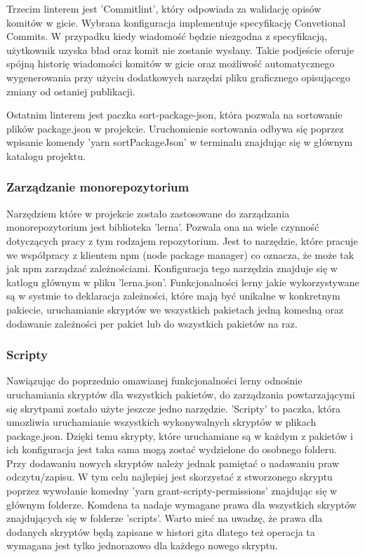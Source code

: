 Trzecim linterem jest 'Commitlint', który odpowiada za walidację opisów komitów w gicie. Wybrana konfiguracja implementuje specyfikację Convetional Commits. W przypadku kiedy wiadomość będzie niezgodna z specyfikacją, użytkownik uzyska bład oraz komit nie zostanie wysłany. Takie podjeście oferuje spójną historię wiadomości komitów w gicie oraz możliwość automatycznego wygenerowania przy użyciu dodatkowych narzędzi pliku graficznego opisującego zmiany od ostaniej publikacji.

Ostatnim linterem jest paczka sort-package-json, która pozwala na sortowanie plików package.json w projekcie. Uruchomienie sortowania odbywa się poprzez wpisanie komendy 'yarn sortPackageJson' w terminalu znajdując się w głównym katalogu projektu. 

\subsubsection{Zarządzanie monorepozytorium}
Narzędziem które w projekcie zostało zastosowane do zarządzania monorepozytorium jest biblioteka 'lerna'. Pozwala ona na wiele czynność dotyczących pracy z tym rodzajem repozytorium. Jest to narzędzie, które pracuje we współpracy z klientem npm (node package manager) co oznacza, że może tak jak npm zarządzać zależnościami. Konfiguracja tego narzędzia znajduje się w katlogu głównym w pliku 'lerna.json'. Funkcjonalności lerny jakie wykorzystywane są w systmie to deklaracja zależności, które mają być unikalne w konkretnym pakiecie, uruchamianie skryptów we wszystkich pakietach jedną komedną oraz dodawanie zależności per pakiet lub do wszystkich pakietów na raz.

\subsubsection{Scripty}
Nawiązując do poprzednio omawianej funkcjonalności lerny odnośnie uruchamiania skryptów dla wszystkich pakietów, do zarządzania powtarzającymi się skrytpami zostało użyte jeszcze jedno narzędzie. 'Scripty' to paczka, która umozliwia uruchamianie wszystkich wykonywalnych skryptów w plikach package.json. Dzięki temu skrypty, które uruchamiane są w każdym z pakietów i ich konfiguracja jest taka sama mogą zostać wydzielone do osobnego folderu. Przy dodawaniu nowych skryptów należy jednak pamiętać o nadawaniu praw odczytu/zapisu. W tym celu najlepiej jest skorzystać z stworzonego skryptu poprzez wywołanie komedny 'yarn grant-scripty-permissions' znajdując się w głównym folderze. Komdena ta nadaje wymagane prawa dla wszystkich skryptów znajdujących się w folderze 'scripts'. Warto mieć na uwadzę, że prawa dla dodanych skryptów będą zapisane w histori gita dlatego też operacja ta wymagana jest tylko jednorazowo dla każdego nowego skryptu.

